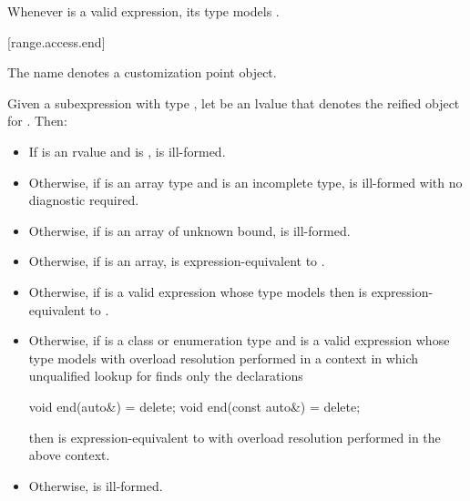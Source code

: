 \pnum
\begin{note}
Whenever  is a valid expression, its type models
.
\end{note}

[range.access.end]{}
%

\pnum
The name  denotes a customization point
object.

\pnum
Given a subexpression  with type ,
let  be an lvalue that denotes the reified object for .
Then:
\begin{itemize}
\item
  If  is an rvalue and
   is ,
   is ill-formed.

\item
  Otherwise, if  is an array type and
   is an incomplete type,
   is ill-formed with no diagnostic required.

\item
  Otherwise, if  is an array of unknown bound,
   is ill-formed.

\item
  Otherwise, if  is an array,
   is expression-equivalent to
  .

\item
  Otherwise, if 
  is a valid expression whose type models
  then  is expression-equivalent to
  .

\item
  Otherwise, if  is a class or enumeration type and
  is a valid expression whose type models
  with overload resolution performed in a context in which
  unqualified lookup for  finds only the declarations
\begin{codeblock}
void end(auto&) = delete;
void end(const auto&) = delete;
\end{codeblock}
  then  is expression-equivalent to
  with overload resolution performed in the above context.

\item
  Otherwise,  is ill-formed.
\end{itemize}

